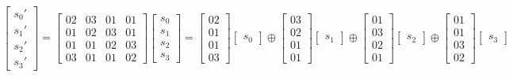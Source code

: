 \begin{gather}
  \begin{bmatrix} %
    s_{0}' \\ s_{1}' \\ s_{2}' \\ s_{3}'
  \end{bmatrix}
  =
  \begin{bmatrix}
    02 & 03 & 01 & 01 \\
    01 & 02 & 03 & 01 \\
    01 & 01 & 02 & 03 \\
    03 & 01 & 01 & 02
  \end{bmatrix}
  \begin{bmatrix} %
    s_{0} \\ s_{1} \\ s_{2} \\ s_{3}
  \end{bmatrix}
  =
  \begin{bmatrix}
    02 \\ 01 \\ 01 \\ 03
  \end{bmatrix}
  \begin{bmatrix} s_{0} \end{bmatrix} \oplus
  \begin{bmatrix}
    03 \\ 02 \\ 01 \\ 01
  \end{bmatrix}
  \begin{bmatrix} s_{1} \end{bmatrix} \oplus
  \begin{bmatrix}
    01 \\ 03 \\ 02 \\ 01
  \end{bmatrix}
  \begin{bmatrix} s_{2} \end{bmatrix} \oplus
  \begin{bmatrix}
    01 \\ 01 \\ 03 \\ 02
  \end{bmatrix}
  \begin{bmatrix} s_{3} \end{bmatrix}
\end{gather}

